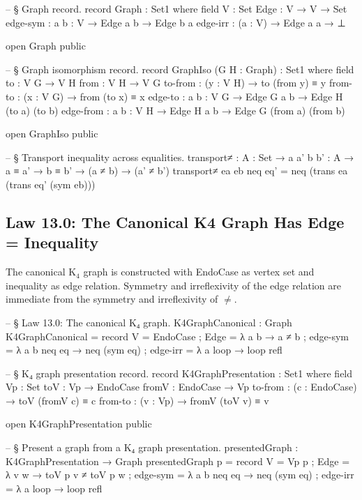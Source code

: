 \documentclass[11pt,a4paper]{book}
\def\texttt#1{#1}%
\def\texorpdfstring#1#2{#2}%
\begin{document}
\begin{code}
-- § Graph record.
record Graph : Set1 where
  field
    V    : Set
    Edge : V → V → Set
    edge-sym : {a b : V} → Edge a b → Edge b a
    edge-irr : (a : V) → Edge a a → ⊥

open Graph public

-- § Graph isomorphism record.
record GraphIso (G H : Graph) : Set1 where
  field
    to       : V G → V H
    from     : V H → V G
    to-from  : (y : V H) → to (from y) ≡ y
    from-to  : (x : V G) → from (to x) ≡ x
    edge-to  : {a b : V G} → Edge G a b → Edge H (to a) (to b)
    edge-from : {a b : V H} → Edge H a b → Edge G (from a) (from b)

open GraphIso public

-- § Transport inequality across equalities.
transport≠ :
  {A : Set} →
  {a a' b b' : A} →
  a ≡ a' →
  b ≡ b' →
  (a ≠ b) →
  (a' ≠ b')
transport≠ ea eb neq eq' = neq (trans ea (trans eq' (sym eb)))
\end{code}

\subsection{Law 13.0: The Canonical K\texorpdfstring{$_4$}{4} Graph Has Edge = Inequality}

The canonical K$_4$ graph is constructed with \texttt{EndoCase} as vertex set and inequality as edge relation.
Symmetry and irreflexivity of the edge relation are immediate from the symmetry and irreflexivity of $\neq$.

\begin{code}
-- § Law 13.0: The canonical K₄ graph.
K4GraphCanonical : Graph
K4GraphCanonical = record
  { V = EndoCase
  ; Edge = λ a b → a ≠ b
  ; edge-sym = λ {a} {b} neq eq → neq (sym eq)
  ; edge-irr = λ a loop → loop refl
  }

-- § K₄ graph presentation record.
record K4GraphPresentation : Set1 where
  field
    Vp      : Set
    toV     : Vp → EndoCase
    fromV   : EndoCase → Vp
    to-from : (c : EndoCase) → toV (fromV c) ≡ c
    from-to : (v : Vp) → fromV (toV v) ≡ v

open K4GraphPresentation public

-- § Present a graph from a K₄ graph presentation.
presentedGraph : K4GraphPresentation → Graph
presentedGraph p = record
  { V = Vp p
  ; Edge = λ v w → toV p v ≠ toV p w
  ; edge-sym = λ {a} {b} neq eq → neq (sym eq)
  ; edge-irr = λ a loop → loop refl
  }
\end{code}
\end{document}

